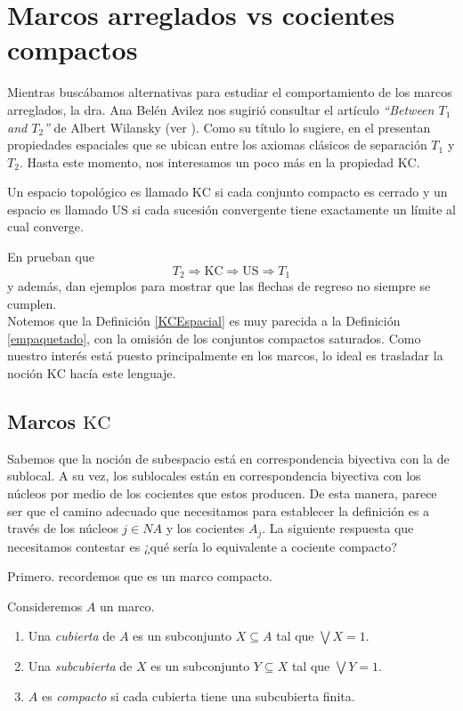 \chapter{Marcos arreglados vs cocientes compactos}\label{MarcosKC}

Mientras buscábamos alternativas para estudiar el comportamiento de los marcos arreglados, la dra. Ana Belén Avilez nos sugirió consultar el artículo \emph{``Between $T_1$ and $T_2$''} de Albert Wilansky (ver \cite{A.W.}). Como su título lo sugiere, en el presentan propiedades espaciales que se ubican 
entre los axiomas clásicos de separación $T_1$ y $T_2$. Hasta este momento, nos interesamos un poco más en la propiedad $\mathrm{KC}$. 

\begin{dfn}\label{KCEspacial}
Un espacio topológico es llamado $\mathrm{KC}$ si cada conjunto compacto es cerrado y un espacio es llamado $\mathrm{US}$ si cada sucesión convergente tiene exactamente un límite al cual converge.
\end{dfn}

En \cite{A.W.} prueban que 
\[
T_2\Rightarrow \mathrm{KC} \Rightarrow \mathrm{US} \Rightarrow T_1
\]
y además, dan ejemplos para mostrar que las flechas de regreso no siempre se cumplen.\\

Notemos que la Definición \ref{KCEspacial} es muy parecida a la Definición \ref{empaquetado}, con la omisión de los conjuntos compactos saturados. Como nuestro interés está puesto principalmente en los marcos, lo ideal es trasladar 
la noción $\mathrm{KC}$ hacía este lenguaje.

\section{Marcos $\mathrm{KC}$}\label{Marcoskc}
    
Sabemos que la noción de subespacio está en correspondencia biyectiva con la de sublocal. A su vez, los sublocales están en correspondencia biyectiva con los núcleos por medio de los cocientes que estos producen. De esta manera, parece ser que el 
camino adecuado que necesitamos para establecer la definición es a través de los núcleos $j\in NA$ y los cocientes $A_j$. La siguiente respuesta que necesitamos contestar es ¿qué sería lo equivalente a cociente compacto?

Primero. recordemos que es un marco compacto.

\begin{dfn}\label{marcocompacto}
Consideremos $A$ un marco. 
\begin{enumerate}
\item Una \emph{cubierta} de $A$ es un subconjunto $X\subseteq A$ tal que $\bigvee X=1$. 
\item Una \emph{subcubierta} de $X$ es un subconjunto $Y\subseteq X$ tal que $\bigvee Y=1$.
\item $A$ es \emph{compacto} si cada cubierta tiene una subcubierta finita.
\end{enumerate}
\end{dfn}

